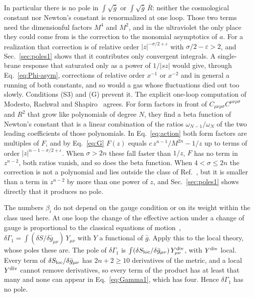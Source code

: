 \documentclass[aps,prd,10pt,twocolumn,superscriptaddress,nofootinbib,floatfix,longbibliography]{revtex4-2}
\begin{document}
In particular there is no pole in $\int\sqrt{\bar g}$ or $\int\sqrt{\bar g}\,\bar R$: neither the cosmological constant nor Newton's constant is renormalized at one loop. Those two terms need the dimensionful factors $M^4$ and $M^2$, and in the ultraviolet the only place they could come from is the correction to the monomial asymptotics of $a$. For a realization that correction is of relative order $|z|^{-\sigma/2+\varepsilon}$ with $\sigma/2-\varepsilon>2$, and Sec.~\ref{sec:poles1} shows that it contributes only convergent integrals. A single-brane response that saturated only as a power of $1/|sz|$ would give, through Eq.~\eqref{eq:Phi-asym}, corrections of relative order $x^{-1}$ or $x^{-2}$ and in general a running of both constants, and so would a gas whose fluctuations died out too slowly. Conditions (S3) and (G) prevent it. The explicit one-loop computation of Modesto, Rachwa{\l} and Shapiro~\cite{ModestoRachwalShapiro2018} agrees. For form factors in front of $C_{\mu\nu\rho\sigma}C^{\mu\nu\rho\sigma}$ and $R^2$ that grow like polynomials of degree $N$, they find a beta function of Newton's constant that is a linear combination of the ratios $\omega_{N-1}/\omega_N$ of the two leading coefficients of those polynomials. In Eq.~\eqref{eq:action} both form factors are multiples of $F$, and by Eq.~\eqref{eq:G} $F(z)$ equals $c\,z^{n-1}/M^{2n}-1/z$ up to terms of order $|z|^{n-1-\sigma/2+\varepsilon}$. When $\sigma>2n$ these fall faster than $1/z$, $F$ has no term in $z^{n-2}$, both ratios vanish, and so does the beta function. When $4<\sigma\le2n$ the correction is not a polynomial and lies outside the class of Ref.~\cite{ModestoRachwalShapiro2018}, but it is smaller than a term in $z^{n-2}$ by more than one power of $z$, and Sec.~\ref{sec:poles1} shows directly that it produces no pole.

The numbers $\beta_i$ do not depend on the gauge condition or on its weight within the class used here. At one loop the change of the effective action under a change of gauge is proportional to the classical equations of motion~\cite{KalloshTarasovTyutin1978}, $\delta\Gamma_1=\int(\delta S/\delta\bar g_{\mu\nu})\,Y_{\mu\nu}$ with $Y$ a functional of $\bar g$. Apply this to the local theory, whose poles these are. The pole of $\delta\Gamma_1$ is $\int(\delta S_{\rm loc}/\delta\bar g_{\mu\nu})\,Y^{\rm div}_{\mu\nu}$, with $Y^{\rm div}$ local. Every term of $\delta S_{\rm loc}/\delta\bar g_{\mu\nu}$ has $2n+2\ge10$ derivatives of the metric, and a local $Y^{\rm div}$ cannot remove derivatives, so every term of the product has at least that many and none can appear in Eq.~\eqref{eq:Gamma1}, which has four. Hence $\delta\Gamma_1$ has no pole.
\end{document}
